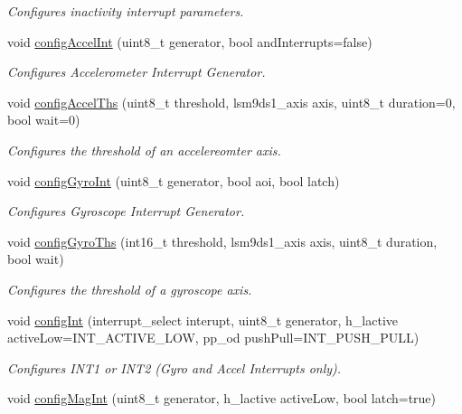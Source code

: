 \begin{DoxyCompactItemize}
\begin{DoxyCompactList}\small\item\em Configures inactivity interrupt parameters. \end{DoxyCompactList}\item 
void \hyperlink{classLSM9DS1_a1e8ebc6c1e3876d8936197dc93f76717}{config\+Accel\+Int} (uint8\+\_\+t generator, bool and\+Interrupts=false)
\begin{DoxyCompactList}\small\item\em Configures Accelerometer Interrupt Generator. \end{DoxyCompactList}\item 
void \hyperlink{classLSM9DS1_acebcf64ab4e6ea7ed7a23c09ef16afe9}{config\+Accel\+Ths} (uint8\+\_\+t threshold, lsm9ds1\+\_\+axis axis, uint8\+\_\+t duration=0, bool wait=0)
\begin{DoxyCompactList}\small\item\em Configures the threshold of an accelereomter axis. \end{DoxyCompactList}\item 
void \hyperlink{classLSM9DS1_a19a341728c4e5b454de045c8a531cf06}{config\+Gyro\+Int} (uint8\+\_\+t generator, bool aoi, bool latch)
\begin{DoxyCompactList}\small\item\em Configures Gyroscope Interrupt Generator. \end{DoxyCompactList}\item 
void \hyperlink{classLSM9DS1_ad865cc972960ed476fabd54f698adf6e}{config\+Gyro\+Ths} (int16\+\_\+t threshold, lsm9ds1\+\_\+axis axis, uint8\+\_\+t duration, bool wait)
\begin{DoxyCompactList}\small\item\em Configures the threshold of a gyroscope axis. \end{DoxyCompactList}\item 
void \hyperlink{classLSM9DS1_a5b6948b9d4caf57cfe9e0559a0c7f54c}{config\+Int} (interrupt\+\_\+select interupt, uint8\+\_\+t generator, h\+\_\+lactive active\+Low=I\+N\+T\+\_\+\+A\+C\+T\+I\+V\+E\+\_\+\+L\+OW, pp\+\_\+od push\+Pull=I\+N\+T\+\_\+\+P\+U\+S\+H\+\_\+\+P\+U\+LL)
\begin{DoxyCompactList}\small\item\em Configures I\+N\+T1 or I\+N\+T2 (Gyro and Accel Interrupts only). \end{DoxyCompactList}\item 
void \hyperlink{classLSM9DS1_a54a521668eb63d504d227c6d460723e0}{config\+Mag\+Int} (uint8\+\_\+t generator, h\+\_\+lactive active\+Low, bool latch=true)

\end{DoxyCompactItemize}
